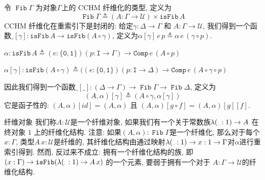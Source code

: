 \documentclass[aspectratio=169,xcolor=dvipsnames]{beamer}
\newcommand\calU{\mathcal{U}}
\newcommand\isFib{\mathtt{isFib}}
\newcommand\Comp{\mathtt{Comp}}
\newcommand\ttI{\mathtt{I}}
\newcommand\ttzero{\mathtt{0}}
\newcommand\ttone{\mathtt{1}}
\newcommand{\ul}{{\scalebox{0.4}[0.4]{\_}}}
\DeclareMathOperator\Fib{\mathtt{Fib}}
\begin{document}
\begin{frame}
  令 $\Fib\Gamma$ 为对象$\Gamma$上的 CCHM 纤维化的类型, 定义为
  \[
  \Fib\Gamma\triangleq(A:\Gamma\to\calU)\times\isFib\,A
  \]
  CCHM 纤维化在重索引下是封闭的: 给定$\gamma:\Delta\to\Gamma$ 和 $A:\Gamma\to\calU$, 我们得到一个函数$\_[\gamma]:\isFib\,A\to\isFib(A\circ\gamma)$, 定义为$\alpha[\gamma]\,e\,p\triangleq\alpha\,e\,(\gamma\circ p)$.
\begin{framed}
  $\alpha:\isFib\,A\triangleq(e:\{\ttzero,\ttone\})(p:\ttI\to\Gamma)\to\Comp\,e\,(A\circ p)$
  
  $\alpha[\gamma]:\isFib(A\circ\gamma)\triangleq((e:\{\ttzero,\ttone\})(p:\ttI\to\Delta)\to\Comp\,e\,(A\circ\gamma\circ p)$
\end{framed}
因此我们得到一个函数$\_[\_]:(\Delta\to\Gamma)\to\Fib\Gamma\to\Fib\Delta$, 定义为
\[
(A,\alpha)[\gamma]\triangleq(A\circ\gamma,\alpha[\gamma])
\]
它是函子性的: $(A,\alpha)[id]=(A,\alpha)$ 且 $(A,\alpha)[g\circ f]=(A,\alpha)[g][f]$.
\end{frame}

\begin{frame}{纤维对象}
  我们称$A:\calU$是一个纤维对象, 如果我们有一个关于常数族$\lambda(\ul:1)\to A$ 在终对象 $1$ 上的纤维化结构. 注意: 如果$(A,\alpha):\Fib\Gamma$是一个纤维化, 那么对于每个$x:\Gamma$, 类型$A\,x:\calU$是纤维的, 其纤维化结构由通过映射$\lambda(\ul:1)\to x:1\to\Gamma$对$\alpha$进行重索引得到. 然而, 反过来不成立: 拥有一个纤维化结构的族, 即$(x:\Gamma)\to\isFib(\lambda(\ul:1)\to A\,x)$ 的一个元素, 要弱于拥有一个对于 $A:\Gamma\to\calU$的纤维化结构.
\end{frame}
\end{document}
